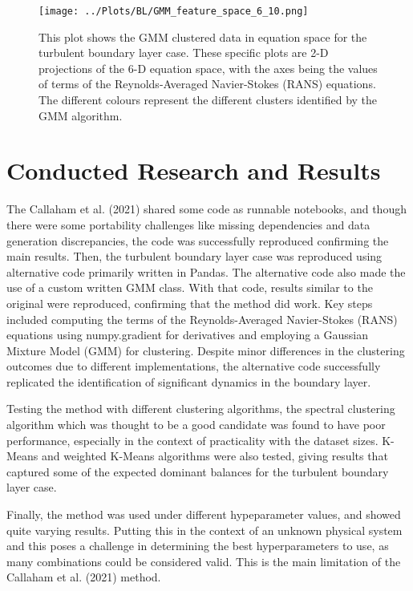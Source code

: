 \documentclass[12pt]{report} %
\begin{document}
\begin{figure}[h]
  \centering
  \texttt{[image: ../Plots/BL/GMM\_feature\_space\_6\_10.png]}
  \caption{This plot shows the GMM clustered data in equation space for the turbulent boundary layer case. These specific plots are 2-D projections of the 6-D equation space, with the axes being the values of terms of the Reynolds-Averaged Navier-Stokes (RANS) equations. The different colours represent the different clusters identified by the GMM algorithm.}
  \label{fig:EquationSpace}
\end{figure}


\section{Conducted Research and Results}

The Callaham et al. (2021) shared some code as runnable notebooks, and though there were some portability challenges like missing dependencies and data generation discrepancies, the code was successfully reproduced confirming the main results. Then, the turbulent boundary layer case was reproduced using alternative code primarily written in Pandas. The alternative code also made the use of a custom written GMM class. With that code, results similar to the original were reproduced, confirming that the method did work. Key steps included computing the terms of the Reynolds-Averaged Navier-Stokes (RANS) equations using numpy.gradient for derivatives and employing a Gaussian Mixture Model (GMM) for clustering. Despite minor differences in the clustering outcomes due to different implementations, the alternative code successfully replicated the identification of significant dynamics in the boundary layer.

Testing the method with different clustering algorithms, the spectral clustering algorithm which was thought to be a good candidate \cite[Supplementary Information]{callaham2021learning} was found to have poor performance, especially in the context of practicality with the dataset sizes. K-Means and weighted K-Means algorithms were also tested, giving results that captured some of the expected dominant balances for the turbulent boundary layer case.


Finally, the method was used under different hypeparameter values, and showed quite varying results. Putting this in the context of an unknown physical system and this poses a challenge in determining the best hyperparameters to use, as many combinations could be considered valid. This is the main limitation of the Callaham et al. (2021) method.
\end{document}
